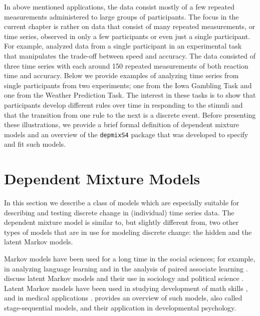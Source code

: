 \documentclass[a4paper,12pt,man]{apa} %
\newcommand{\citep}{\cite}
\newcommand{\citet}{\citeA}
\newcommand{\pkg}{\texttt}
\begin{document}
In above mentioned applications, the data consist mostly of a few
repeated measurements administered to large groups of participants.
The focus in the current chapter is rather on data that consist of
many repeated measurements, or time series, observed in only a few
participants or even just a single participant.  For example,
\citet{Visser2009c} analyzed data from a single participant in an
experimental task that manipulates the trade-off between speed and
accuracy.  The data consisted of three time series with each around
150 repeated measurements of both reaction time and accuracy.  Below
we provide examples of analyzing time series from single participants
from two experiments; one from the Iowa Gambling Task and one from the
Weather Prediction Task.  The interest in these tasks is to show that
participants develop different rules over time in responding to the
stimuli and that the transition from one rule to the next is a
discrete event.  Before presenting these illustrations, we provide a
brief formal definition of dependent mixture models and an overview of
the \pkg{depmixS4} package that was developed to specify and fit such
models.


\section{Dependent Mixture Models}

In this section we describe a class of models which are especially
suitable for describing and testing discrete change in (individual)
time series data.  The dependent mixture model is similar to, but
slightly different from, two other types of models that are in use for
modeling discrete change: the hidden and the latent Markov models.

Markov models have been used for a long time in the social sciences;
for example, in analyzing language learning
\cite{Miller1952,Miller1963} and in the analysis of paired associate
learning \cite{Wickens1982}.   discuss latent
Markov models and their use in sociology and political science
\citep<see also>{McCutcheon1987}.  Latent Markov models have been used
in studying development of math skills \citep{Collins1992}, and in
medical applications \citep{Reboussin1998}.  \citet{Kaplan2008}
provides an overview of such models, also called stage-sequential
models, and their application in developmental psychology.
\end{document}
